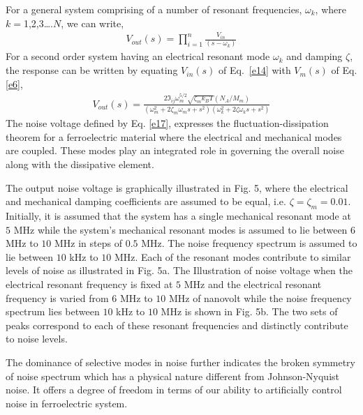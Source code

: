 \documentclass[12pt,column,showpacs,pre,preprintnumbers,amsmath,amssymb,aps,standalone]{revtex4-2}
\begin{document}
For a general system comprising of a number of resonant frequencies, $\omega_k$, where $k=$1,2,3….$N$, we can write\cite{23,24},
\begin{align} \label{e16}
V_{out}(s)=\prod_{i=1}^n\frac{V_{in}}{(s-\omega_k)}
\end{align}
For a second order system having an electrical resonant mode $\omega_k$ and damping  $\zeta$, the response can be written by equating $V_{in}(s)$ of Eq.~\ref{e14} with $V_m(s)$ of Eq. \ref{e6},                        
\begin{align} \label{e17}
V_{out}(s)=\frac{2\Im_{ij}\omega_m^{5/2}\sqrt{\zeta_m k_BT}(N_A/M_m)}{(\omega_m^2+2\zeta_m \omega_ms+s^2)(\omega_k^2+2\zeta \omega_ks+s^2)}
\end{align}
The noise voltage defined by Eq. \ref{e17}, expresses the fluctuation-dissipation theorem for a ferroelectric material where the electrical and mechanical modes are coupled. These modes play an integrated role in governing the overall noise along with the dissipative element. 

The output noise voltage is graphically illustrated in Fig. 5, where the electrical and mechanical damping coefficients are assumed to be equal, i.e. $ \zeta=\zeta_m=0.01 $. Initially, it is assumed that the system has a single mechanical resonant mode at $ 5 $ MHz while the system's mechanical resonant modes is assumed to lie between $6$ MHz to $10$ MHz in steps of $0.5$ MHz. The noise frequency spectrum is assumed to lie between $ 10 $ kHz to $ 10 $ MHz. Each of the resonant modes contribute to similar levels of noise as illustrated in Fig. 5a. The Illustration of noise voltage when the electrical resonant frequency is fixed at $5$ MHz and the electrical resonant frequency is varied from  $6$ MHz to $10$ MHz of nanovolt while the noise frequency spectrum lies between $ 10 $ kHz to $ 10 $ MHz is shown in Fig. 5b. The two sets of peaks correspond to each of these resonant frequencies and distinctly contribute to noise levels.

The dominance of selective modes in noise further indicates the broken symmetry of noise spectrum which has a physical nature different from Johnson-Nyquist noise. It offers a degree of freedom in terms of our ability to artificially control noise in ferroelectric system.	
\end{document}
